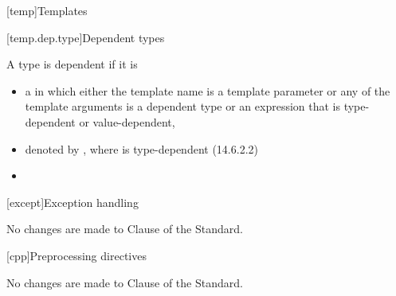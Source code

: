 
[temp]{Templates}

\setcounter{section}{6}
\setcounter{subsection}{2}

[temp.dep.type]{Dependent types}

\begin{std.txt}
A type is dependent if it is \newline
[...]

\begin{itemize}
  \item a  in which either the template name is
  a template parameter or any of the template arguments is a dependent type or
  an expression that is type-dependent or value-dependent, 
  \item denoted by \tcode{)}, where
         is type-dependent (14.6.2.2)
  \item {}
\end{itemize}
\end{std.txt}

[except]{Exception handling}

No changes are made to Clause \the\value{chapter} of the \Cpp Standard.

[cpp]{Preprocessing directives}

No changes are made to Clause \the\value{chapter} of the \Cpp Standard.
